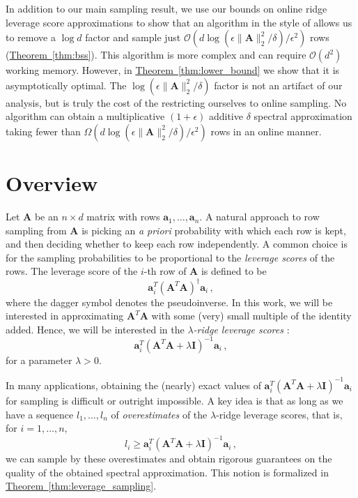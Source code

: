 \documentclass[11pt]{article}
\numberwithin{equation}{section}
\theoremstyle{definition}
\theoremstyle{plain}
\newcommand{\expref}[2]{\hyperref[#2]{#1~\ref{#2}}}
\newcommand{\Oh}{\ensuremath{\mathcal{O}}}
\newcommand{\bv}[1]{\mathbf{#1}}
\newcommand{\norm}[1]{\|#1\|}
\begin{document}
In addition to our main sampling result, we use our bounds on online ridge leverage score approximations to show that an algorithm in the style of \cite{batson2012twice} allows us to remove a $\log d$ factor and sample just $\Oh(d \log (\epsilon\norm{\bv A}_2^2/\delta) / \epsilon^2)$ rows (\expref{Theorem}{thm:bss}).
This algorithm is more complex and can require $\Oh(d^2)$ working memory. However, in \expref{Theorem}{thm:lower_bound} we show that it is asymptotically optimal. The $\log (\epsilon\norm{\bv A}_2^2/\delta)$ factor is not an artifact of our analysis, but is truly the cost of the restricting ourselves to online sampling. No algorithm can obtain a multiplicative $(1+\epsilon)$ additive $\delta$ spectral approximation taking fewer than $\Omega(d \log (\epsilon\norm{\bv A}_2^2/\delta) / \epsilon^2)$ rows in an online manner.

\section{Overview}
\label{sec:overview}
Let $\bv{A}$ be an $n \times d$ matrix with rows $\bv{a}_1, \ldots, \bv{a}_n$.
A natural approach to row sampling from $\bv A$ is picking an \emph{a priori} probability with which each row is kept,
and then deciding whether to keep each row independently.
A common choice is for the sampling probabilities to be proportional to the \emph{leverage scores} of the rows.
The leverage score of the $i$-th row of $\bv{A}$ is defined to be
$$
    \bv{a}_i^T (\bv{A}^T\bv{A})^{\dagger} \bv{a}_i\,,
$$
where the dagger symbol denotes the pseudoinverse.
In this work, we will be interested in approximating $\bv{A}^T\bv{A}$ with some (very) small multiple of the identity added.
Hence, we will be interested in the \emph{$\lambda$-ridge leverage scores} \cite{alaoui2014fast}:
$$
    \bv{a}_i^T (\bv{A}^T\bv{A} + \lambda \bv{I})^{-1} \bv{a}_i\,,
$$
for a parameter $\lambda > 0$.

In many applications, obtaining the (nearly) exact values of $\bv{a}_i^T (\bv{A}^T\bv{A} + \lambda \bv{I})^{-1} \bv{a}_i$ for sampling is difficult or outright impossible.
A key idea is that as long as we have a sequence $l_1, \ldots, l_n$ of \emph{overestimates} of the $\lambda$-ridge leverage scores, that is, for $i=1,\ldots,n$,
$$
    l_i \geq \bv{a}_i^T (\bv{A}^T\bv{A} + \lambda \bv{I})^{-1} \bv{a}_i\,,
$$
we can sample by these overestimates and obtain rigorous guarantees on the quality of the obtained spectral approximation.
This notion is formalized in \expref{Theorem}{thm:leverage_sampling}.
\end{document}
